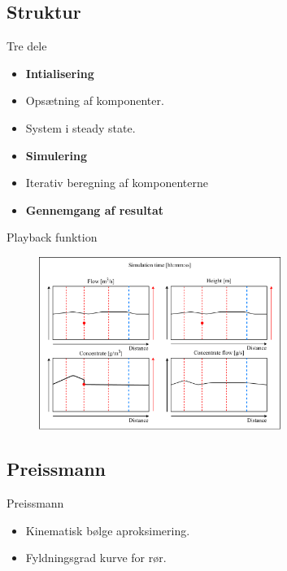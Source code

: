 \subsection{Struktur}
\begin{frame}{Tre dele}{}
\vfill\vfill\centering

\begin{itemize}
	\item \textbf{Intialisering}
	\item<1-> Opsætning af komponenter.
	\item<2-> System i steady state.
	\item<3-> \textbf{Simulering}
	\item<4-> Iterativ beregning af komponenterne
	\item<5-> \textbf{Gennemgang af resultat}
\end{itemize}

\vfill\vfill		
\end{frame}

\begin{frame}{Playback funktion}{}
\vfill\vfill\centering
		\begin{figure}[H]
			\centering
			\includegraphics[width=0.7\textwidth]{Sections/pictures/display_results.pdf}
		\end{figure}
\vfill\vfill		
\end{frame}

\subsection{Preissmann}

\begin{frame}{Preissmann}{}
\vfill\vfill\centering
\begin{itemize}
	\item Kinematisk bølge aproksimering.
	\item Fyldningsgrad kurve for rør.
\end{itemize}
\vfill\vfill		
\end{frame}

